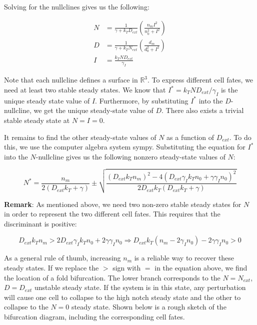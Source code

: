 \documentclass{article}
\begin{document}
\begin{flushleft}
Solving for the nullclines gives us the following:

$$
\begin{aligned}
  N &= \frac{1}{\gamma + k_{T}D_{ext}}\left(\frac{n_{m}I^2}{n_{0}^2 + I^2}\right) \\[5pt]
  D &= \frac{1}{\gamma + k_{T}N_{ext}}\left( \frac{d_{m}}{d_{0}^2 + I^2} \right) \\[5pt]
  I &= \frac{k_{T}ND_{ext}}{\gamma_{I}}
\end{aligned}
$$

Note that each nullcline defines a surface in $\mathbb{R}^3$. To express different cell fates, we need at least two stable steady states. We know that $I^{*} = k_{T}ND_{ext} / \gamma_{I}$ is the unique steady state value of $I$. Furthermore, by substituting $I^{*}$ into the $D$-nullcline, we get the unique steady-state value of $D$. There also exists a trivial stable steady state at $N = I = 0$. 

\medskip

It remains to find the other steady-state values of $N$ as a function of $D_{ext}$. To do this, we use the computer algebra system sympy. Substituting the equation for $I^{*}$ into the $N$-nullcline gives us the following nonzero steady-state values of $N$:

\medskip


$$
N^{*} = \frac{n_{m}}{2(D_{ext}k_{T} + \gamma)} \pm \sqrt{\frac{(D_{ext}k_{T}n_{m})^2 - 4(D_{ext}\gamma_{I}k_{T}n_{0} + \gamma \gamma_{I}n_{0})^2}{2D_{ext}k_{T}(D_{ext}k_{T} + \gamma)}}
$$

\textbf{Remark}: As mentioned above, we need two non-zero stable steady states for $N$ in order to represent the two different cell fates. This requires that the discriminant is positive:

$$D_{ext}k_{T}n_{m} > 2D_{ext}\gamma_{I}k_{T}n_{0} + 2\gamma \gamma_{I} n_{0} \Rightarrow D_{ext}k_{T}(n_{m} - 2\gamma_{I}n_{0}) - 2\gamma \gamma_{I} n_{0} > 0$$

As a general rule of thumb, increasing $n_{m}$ is a reliable way to recover these steady states. If we replace the $>$ sign with $=$ in the equation above, we find the location of a fold bifurcation. The lower branch corresponds to the $N = N_{ext}$, $D = D_{ext}$ unstable steady state. If the system is in this state, any perturbation will cause one cell to collapse to the high notch steady state and the other to collapse to the $N = 0$ steady state. Shown below is a rough sketch of the bifurcation diagram, including the corresponding cell fates.


\end{flushleft}
\end{document}

